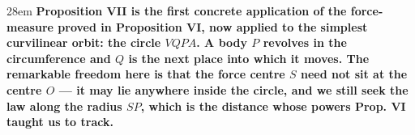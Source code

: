 \documentclass[border=4pt]{standalone}
\begin{document}
\begin{varwidth}{28em}
\large\bfseries
Proposition VII is the first concrete application of the force-measure proved in Proposition VI,      now applied to the simplest curvilinear orbit: the circle $VQPA$.      A body $P$ revolves in the circumference and $Q$ is the next place into which it moves.      The remarkable freedom here is that the force centre $S$ need not sit at the centre $O$ —      it may lie anywhere inside the circle, and we still seek the law along the radius $SP$,      which is the distance whose powers Prop. VI taught us to track.
\end{varwidth}
\end{document}
